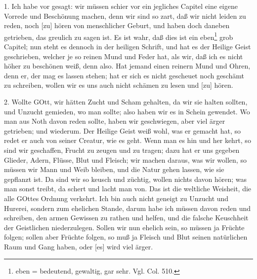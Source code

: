 \begin{schriftzitat}
\end{schriftzitat}

1. Ich habe vor gesagt: wir müssen schier vor ein jegliches Capitel eine eigene Vorrede und Beschönung machen, denn wir sind so zart, daß wir nicht leiden zu reden, noch [zu] hören von menschlicher Geburt, und haben doch daneben getrieben, das greulich zu sagen ist. Es ist wahr, daß dies ist ein eben\footnote{eben = bedeutend, gewaltig, gar sehr. Vgl. Col. 510.} grob Capitel; nun steht es dennoch in der heiligen Schrift, und hat es der Heilige Geist geschrieben, welcher je so reinen Mund und Feder hat, als wir, daß ich es nicht höher zu beschönen weiß, denn also. Hat jemand einen reinern Mund und Ohren, denn er, der mag es lassen stehen; hat er sich es nicht gescheuet noch geschämt zu schreiben, wollen wir es uns auch nicht schämen zu lesen und [zu] hören.

2. Wollte GOtt, wir hätten Zucht und Scham gehalten, da wir sie halten sollten, und Unzucht gemieden, wo man sollte; also haben wir es in Schein gewendet. Wo man aus Noth davon reden sollte, haben wir geschwiegen, aber viel ärger getrieben; und wiederum. Der Heilige Geist weiß wohl, was er gemacht hat, so redet er auch von seiner Creatur, wie es geht. Wenn man es hin und her kehrt, so sind wir geschaffen, Frucht zu zeugen und zu tragen; dazu hat er uns gegeben Glieder, Adern, Flüsse, Blut und
Fleisch; wir machen daraus, was wir wollen, so müssen wir Mann und Weib bleiben, und die Natur gehen lassen, wie sie gepflanzt ist. Da sind wir so keusch und züchtig, wollen nichts davon hören; was man sonst treibt, da schert und lacht man von. Das ist die weltliche Weisheit, die alle GOttes Ordnung verkehrt. Ich bin auch nicht geneigt zu Unzucht und Hurerei, sondern zum ehelichen Stande, darum habe ich müssen davon reden und schreiben, den armen Gewissen zu rathen und helfen, und die falsche Keuschheit der Geistlichen niederzulegen. Sollen wir nun ehelich sein, so müssen ja Früchte folgen; sollen aber Früchte folgen, so muß ja Fleisch und Blut seinen natürlichen Raum und Gang haben, oder [es] wird viel ärger.

